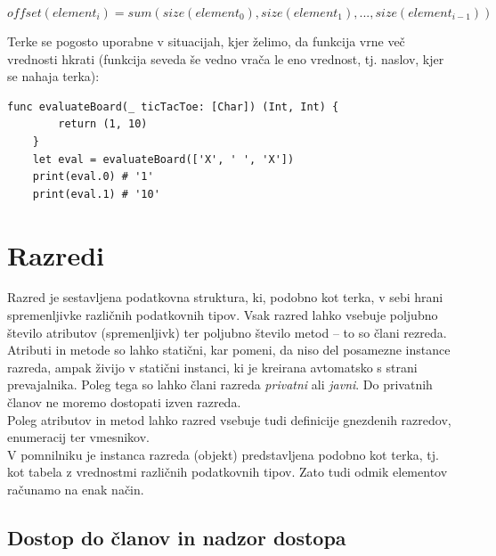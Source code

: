 \documentclass[a4paper, 12p]{book}
\begin{document}
\vspace{-5mm}
\[ offset ( element_i )  = sum ( size ( element_0 ), size( element_1 ), ..., size ( element_{i-1})) \]

Terke se pogosto uporabne v situacijah, kjer želimo, da funkcija vrne več vrednosti hkrati (funkcija seveda še vedno vrača le eno vrednost, tj. naslov, kjer se nahaja terka):

\begin{lstlisting}[caption={Funkcija, ki vrača dve vrednosti hkrati.}, captionpos=b]
	func evaluateBoard(_ ticTacToe: [Char]) (Int, Int) {
	    return (1, 10)
	}
	let eval = evaluateBoard(['X', ' ', 'X'])
	print(eval.0) # '1'
	print(eval.1) # '10'
\end{lstlisting}

\section{Razredi}

Razred je sestavljena podatkovna struktura, ki, podobno kot terka, v sebi hrani spremenljivke različnih podatkovnih tipov. Vsak razred lahko vsebuje poljubno število atributov (spremenljivk) ter poljubno število metod – to so člani rezreda. \\
\indent Atributi in metode so lahko statični, kar pomeni, da niso del posamezne instance razreda, ampak živijo v statični instanci, ki je kreirana avtomatsko s strani prevajalnika. Poleg tega so lahko člani razreda \textit{privatni} ali \textit{javni}. Do privatnih članov ne moremo dostopati izven razreda. \\
\indent Poleg atributov in metod lahko razred vsebuje tudi definicije gnezdenih razredov, enumeracij ter vmesnikov.\\
\indent V pomnilniku je instanca razreda (objekt) predstavljena podobno kot terka, tj. kot tabela z vrednostmi različnih podatkovnih tipov. Zato tudi odmik elementov računamo na enak način.

\subsection{Dostop do članov in nadzor dostopa}
\end{document}
